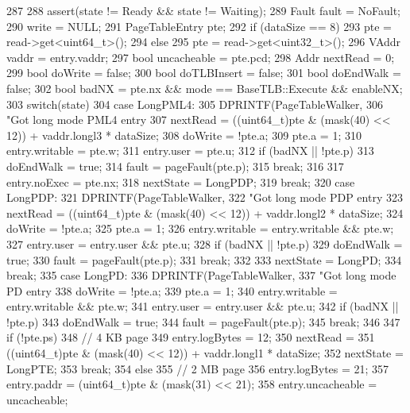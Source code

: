 \begin{DoxyCode}
287 {
288     assert(state != Ready && state != Waiting);
289     Fault fault = NoFault;
290     write = NULL;
291     PageTableEntry pte;
292     if (dataSize == 8)
293         pte = read->get<uint64_t>();
294     else
295         pte = read->get<uint32_t>();
296     VAddr vaddr = entry.vaddr;
297     bool uncacheable = pte.pcd;
298     Addr nextRead = 0;
299     bool doWrite = false;
300     bool doTLBInsert = false;
301     bool doEndWalk = false;
302     bool badNX = pte.nx && mode == BaseTLB::Execute && enableNX;
303     switch(state) {
304       case LongPML4:
305         DPRINTF(PageTableWalker,
306                 "Got long mode PML4 entry %
307         nextRead = ((uint64_t)pte & (mask(40) << 12)) + vaddr.longl3 * dataSize;
308         doWrite = !pte.a;
309         pte.a = 1;
310         entry.writable = pte.w;
311         entry.user = pte.u;
312         if (badNX || !pte.p) {
313             doEndWalk = true;
314             fault = pageFault(pte.p);
315             break;
316         }
317         entry.noExec = pte.nx;
318         nextState = LongPDP;
319         break;
320       case LongPDP:
321         DPRINTF(PageTableWalker,
322                 "Got long mode PDP entry %
323         nextRead = ((uint64_t)pte & (mask(40) << 12)) + vaddr.longl2 * dataSize;
324         doWrite = !pte.a;
325         pte.a = 1;
326         entry.writable = entry.writable && pte.w;
327         entry.user = entry.user && pte.u;
328         if (badNX || !pte.p) {
329             doEndWalk = true;
330             fault = pageFault(pte.p);
331             break;
332         }
333         nextState = LongPD;
334         break;
335       case LongPD:
336         DPRINTF(PageTableWalker,
337                 "Got long mode PD entry %
338         doWrite = !pte.a;
339         pte.a = 1;
340         entry.writable = entry.writable && pte.w;
341         entry.user = entry.user && pte.u;
342         if (badNX || !pte.p) {
343             doEndWalk = true;
344             fault = pageFault(pte.p);
345             break;
346         }
347         if (!pte.ps) {
348             // 4 KB page
349             entry.logBytes = 12;
350             nextRead =
351                 ((uint64_t)pte & (mask(40) << 12)) + vaddr.longl1 * dataSize;
352             nextState = LongPTE;
353             break;
354         } else {
355             // 2 MB page
356             entry.logBytes = 21;
357             entry.paddr = (uint64_t)pte & (mask(31) << 21);
358             entry.uncacheable = uncacheable;
}}}
\end{DoxyCode}
